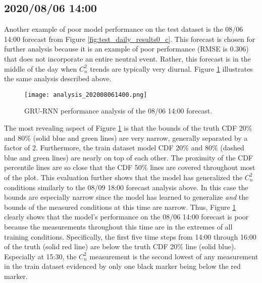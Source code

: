 \subsection{2020/08/06 14:00}
Another example of poor model performance on the test dataset is the 08/06 14:00 forecast from Figure \ref{fig:test_daily_results0_c}. This forecast is chosen for further analysis because it is an example of poor performance (RMSE is 0.306) that does not incorporate an entire neutral event. Rather, this forecast is in the middle of the day when $C_{n}^{2}$ trends are typically very diurnal. Figure \ref{fig:analysis_08061400} illustrates the same analysis described above.
\begin{figure}[h!]
	\centering
	\texttt{[image: analysis\_202008061400.png]}
	\caption{GRU-RNN performance analysis of the 08/06 14:00 forecast.}
	\label{fig:analysis_08061400}
\end{figure}
The most revealing aspect of Figure \ref{fig:analysis_08061400} is that the bounds of the truth CDF 20\% and 80\% (solid blue and green lines) are very narrow, generally separated by a factor of 2. Furthermore, the train dataset model CDF 20\% and 80\% (dashed blue and green lines) are nearly on top of each other. The proximity of the CDF percentile lines are so close that the CDF 50\% lines are covered throughout most of the plot. This evaluation further shows that the model has generalized the $C_{n}^{2}$ conditions similarly to the 08/09 18:00 forecast analysis above. In this case the bounds are especially narrow since the model has learned to generalize \emph{and} the bounds of the measured conditions at this time are narrow. Thus, Figure \ref{fig:analysis_08061400} clearly shows that the model's performance on the 08/06 14:00 forecast is poor because the measurements throughout this time are in the extremes of all training conditions. Specifically, the first five time steps from 14:00 through 16:00 of the truth (solid red line) are below the truth CDF 20\% line (solid blue). Especially at 15:30, the $C_{n}^{2}$ measurement is the second lowest of any measurement in the train dataset evidenced by only one black marker being below the red marker.

